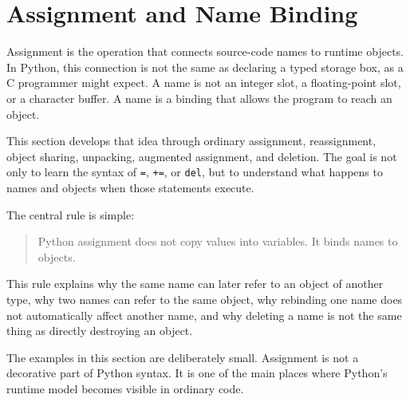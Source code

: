 \section{Assignment and Name Binding}

Assignment is the operation that connects source-code names to runtime objects. In Python, this connection is not the same as declaring a typed storage box, as a C programmer might expect. A name is not an integer slot, a floating-point slot, or a character buffer. A name is a binding that allows the program to reach an object.

This section develops that idea through ordinary assignment, reassignment, object sharing, unpacking, augmented assignment, and deletion. The goal is not only to learn the syntax of \texttt{=}, \texttt{+=}, or \texttt{del}, but to understand what happens to names and objects when those statements execute.

The central rule is simple:

\begin{quote}
Python assignment does not copy values into variables. It binds names to objects.
\end{quote}

This rule explains why the same name can later refer to an object of another type, why two names can refer to the same object, why rebinding one name does not automatically affect another name, and why deleting a name is not the same thing as directly destroying an object.

The examples in this section are deliberately small. Assignment is not a decorative part of Python syntax. It is one of the main places where Python's runtime model becomes visible in ordinary code.
